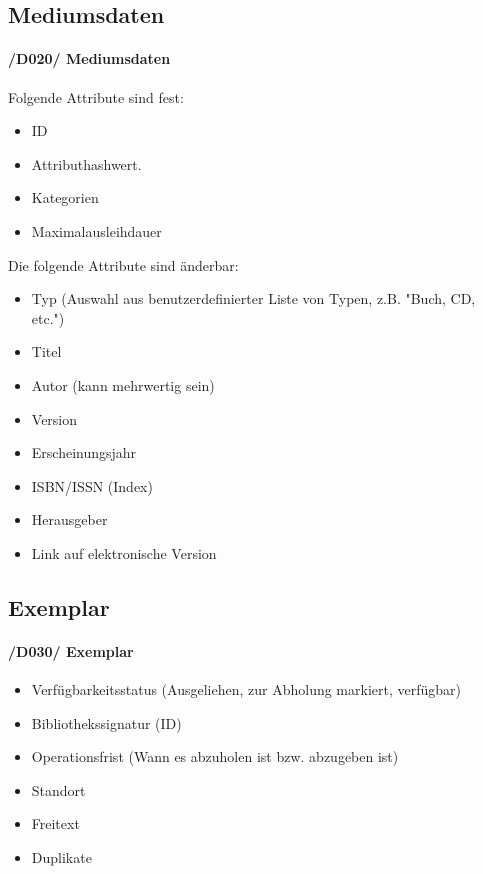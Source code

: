 \documentclass{article}
\begin{document}
	\subsection{Mediumsdaten}
	\label{D020} \paragraph{/D020/ Mediumsdaten}
	Folgende Attribute sind fest:
	
	\begin{itemize}
	    \item ID 
	    \item Attributhashwert.
	    \item Kategorien
	    \item Maximalausleihdauer
	    
	   	\end{itemize}
	   
	   Die folgende Attribute sind änderbar:
	   	\begin{itemize}
	   \item Typ (Auswahl aus benutzerdefinierter Liste von Typen, z.B. "Buch, CD, etc.")
	   \item Titel
	   \item Autor (kann mehrwertig  sein)
	   \item Version
	   \item Erscheinungsjahr
	   \item ISBN/ISSN (Index) 
	   \item Herausgeber
	   \item Link auf elektronische Version
	    
	\end{itemize}
		
	\subsection{Exemplar}
	\label{D030} \paragraph{/D030/ Exemplar}
	\begin{itemize}
        \item Verfügbarkeitsstatus (Ausgeliehen, zur Abholung markiert, verfügbar)
	    \item Bibliothekssignatur (ID)
	    \item Operationsfrist (Wann es abzuholen ist bzw. abzugeben ist)
	    \item Standort
	    \item Freitext
	    \item Duplikate
	   	\end{itemize}
	   	
\end{document}
